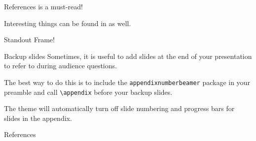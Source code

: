 \begin{frame}{References}
	 is a must-read!
	
	Interesting things can be found in  as well.
\end{frame}

\begin{frame}[standout]
	Standout Frame!
\end{frame}


\appendix
{}
\setcounter{finalframe}{\value{framenumber}}

\begin{frame}[fragile]{Backup slides}
	Sometimes, it is useful to add slides at the end of your presentation to
	refer to during audience questions.
	
	The best way to do this is to include the \verb|appendixnumberbeamer|
	package in your preamble and call \verb|\appendix| before your backup slides.
	
	The theme will automatically turn off slide numbering and progress bars for
	slides in the appendix.
\end{frame}

\begin{frame}{References}
	\small
	\printbibliography[heading=none]
\end{frame}

\setcounter{framenumber}{\value{finalframe}}
